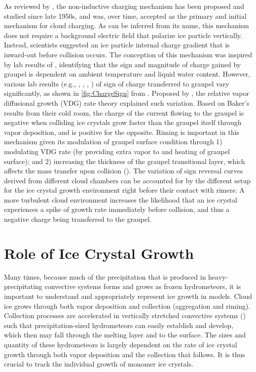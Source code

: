 As reviewed by \cite{saunders2008charge}, the non-inductive charging mechanism has been proposed and studied since late 1950s, and was, over time, accepted as the primary and initial mechanism for cloud charging. As can be inferred from its name, this mechanism does not require a background electric field that polarize ice particle vertically. Instead, scientists suggested an ice particle internal charge gradient that is inward-out before collision occurs. The conception of this mechanism was inspired by lab results of \cite{takahashi1978riming}, identifying that the sign and magnitude of charge gained by graupel is dependent on ambient temperature and liquid water content. However, various lab results (e.g., \cite{takahashi1978riming}, \cite{saunders1998laboratory}, \cite{pereyra2000laboratory}, \cite{saunders2006laboratory}) of sign of charge transferred to graupel vary significantly, as shown in \ref{fig:ChargeSign} from \cite{saunders2008charge}. Proposed by \cite{baker1987influence}, the relative vapor diffusional growth (VDG) rate theory explained such variation. Based on Baker's results from their cold room, the charge of the current flowing to the graupel is negative when colliding ice crystals grow faster than the graupel itself through vapor deposition, and is positive for the opposite. Riming is important in this mechanism given its modulation of graupel surface condition through 1) modulating VDG rate (by providing extra vapor to and heating of graupel surface); and 2) increasing the thickness of the graupel transitional layer, which affects the mass transfer upon collision (\cite{baker1987influence}). The variation of sign reversal curves derived from different cloud chambers can be accounted for by the different setup for the ice crystal growth environment right before their contact with rimers: A more turbulent cloud environment increases the likelihood that an ice crystal experiences a spike of growth rate immediately before collision, and thus a negative charge being transferred to the graupel.
\section{Role of Ice Crystal Growth}
Many times, because much of the precipitation that is produced in heavy-precipitating convective systems forms and grows as frozen hydrometeors, it is important to understand and appropriately represent ice growth in models. 
Cloud ice grows through both vapor deposition and collection (aggregation and riming). Collection processes are accelerated in vertically stretched convective systems (\cite{pinsky2001collision}) such that precipitation-sized hydrometeors can easily establish and develop, which then may fall through the melting layer and to the surface.  The sizes and quantity of these hydrometeors is largely dependent on the rate of ice crystal growth through both vapor deposition and the collection that follows. It is thus crucial to track the individual growth of monomer ice crystals.

